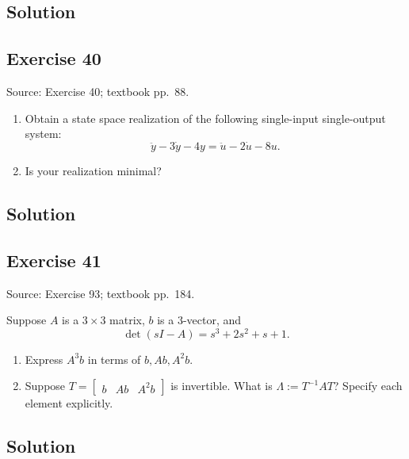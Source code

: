 \documentclass[12pt,a4paper]{article}
\newlength{\questionroom}
\newenvironment{questionprompt}{%
  \begin{lrbox}{\questionbox}\begin{minipage}{\linewidth}%
}{%
  \end{minipage}\end{lrbox}%
  \setlength{\questionroom}{\dimexpr\ht\questionbox+\dp\questionbox+5.2cm\relax}%
  \ifdim\questionroom>\textheight\setlength{\questionroom}{\textheight}\fi
  \Needspace{\questionroom}%
  \noindent\usebox{\questionbox}\par
}
\begin{document}
\subsection*{Solution}
\vspace{3.5cm}


\begin{questionprompt}
\section*{Exercise 40}
\label{practice:40}
{\small Source: Exercise 40; textbook pp.~88.}\par
\begin{enumerate}[label=(\alph*)]
\item Obtain a state space realization of the following single-input single-output system:
\[\ddot y-3\dot y-4y=\ddot u-2\dot u-8u.\]
\item Is your realization minimal?
\end{enumerate}
\end{questionprompt}
\subsection*{Solution}
\vspace{3.5cm}


\begin{questionprompt}
\section*{Exercise 41}
\label{practice:41}
{\small Source: Exercise 93; textbook pp.~184.}\par
Suppose $A$ is a $3\times3$ matrix, $b$ is a $3$-vector, and
\[\det(sI-A)=s^3+2s^2+s+1.\]
\begin{enumerate}[label=(\alph*)]
\item Express $A^3b$ in terms of $b,Ab,A^2b$.
\item Suppose $T=\begin{bmatrix}b&Ab&A^2b\end{bmatrix}$ is invertible. What is $\Lambda:=T^{-1}AT$? Specify each element explicitly.
\end{enumerate}
\end{questionprompt}
\subsection*{Solution}
\vspace{3.5cm}
\end{document}

